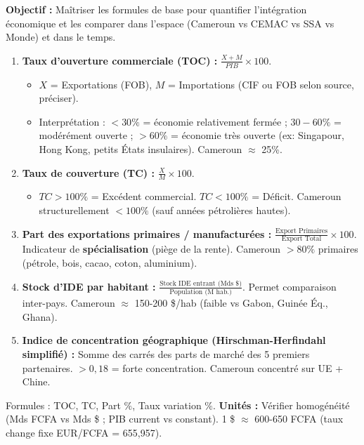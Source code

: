 \documentclass[11pt]{article}
\newcommand{\cle}[1]{{\popxbold\color{popdark}#1}}
\begin{document}
\begin{methode}
\textbf{Objectif :} Maîtriser les formules de base pour quantifier l'intégration économique et les comparer dans l'espace (Cameroun vs CEMAC vs SSA vs Monde) et dans le temps.
\begin{enumerate}
    \item \textbf{Taux d'ouverture commerciale (TOC) :} $\frac{X + M}{PIB} \times 100$.
    \begin{itemize}
        \item $X$ = Exportations (FOB), $M$ = Importations (CIF ou FOB selon source, préciser).
        \item Interprétation : $< 30\%$ = économie relativement fermée ; $30-60\%$ = modérément ouverte ; $> 60\%$ = économie très ouverte (ex: Singapour, Hong Kong, petits États insulaires). Cameroun $\approx$ 25\%.
    \end{itemize}
    \item \textbf{Taux de couverture (TC) :} $\frac{X}{M} \times 100$.
    \begin{itemize}
        \item $TC > 100\%$ = Excédent commercial. $TC < 100\%$ = Déficit. Cameroun structurellement $< 100\%$ (sauf années pétrolières hautes).
    \end{itemize}
    \item \textbf{Part des exportations primaires / manufacturées :} $\frac{\text{Export Primaires}}{\text{Export Total}} \times 100$. Indicateur de \textbf{spécialisation} (piège de la rente). Cameroun $> 80\%$ primaires (pétrole, bois, cacao, coton, aluminium).
    \item \textbf{Stock d'IDE par habitant :} $\frac{\text{Stock IDE entrant (Mds \$)}}{\text{Population (M hab.)}}$. Permet comparaison inter-pays. Cameroun $\approx$ 150-200 \$/hab (faible vs Gabon, Guinée Éq., Ghana).
    \item \textbf{Indice de concentration géographique (Hirschman-Herfindahl simplifié) :} Somme des carrés des parts de marché des 5 premiers partenaires. $> 0,18$ = forte concentration. Cameroun concentré sur UE + Chine.
\end{enumerate}
\cle{Formules} : TOC, TC, Part $\%$, Taux variation $\%$. \textbf{Unités :} Vérifier homogénéité (Mds FCFA vs Mds \$ ; PIB current vs constant). 1 \$ $\approx$ 600-650 FCFA (taux change fixe EUR/FCFA = 655,957).
\end{methode}
\end{document}
